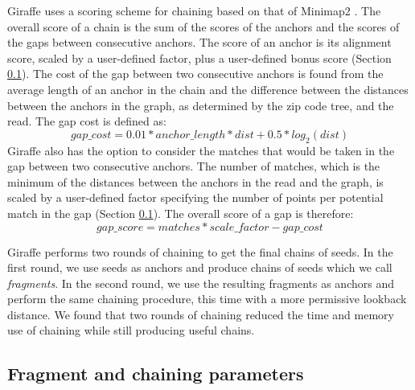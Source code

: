 \documentclass[11pt]{ucscthesis}
\begin{document}
Giraffe uses a scoring scheme for chaining based on that of Minimap2 \cite{minimap2_2021}.
The overall score of a chain is the sum of the scores of the anchors and the scores of the gaps between consecutive anchors.
The score of an anchor is its alignment score, scaled by a user-defined factor, plus a user-defined bonus score (Section \ref{sec:chaining_params}).
The cost of the gap between two consecutive anchors is found from the average length of an anchor in the chain and the difference between the distances between the anchors in the graph, as determined by the zip code tree, and the read.
The gap cost is defined as:
\begin{equation}
gap\_cost = 0.01*anchor\_length*dist + 0.5*log_2(dist)
\end{equation}
Giraffe also has the option to consider the matches that would be taken in the gap between two consecutive anchors.
The number of matches, which is the minimum of the distances between the anchors in the read and the graph, is scaled by a user-defined factor specifying the number of points per potential match in the gap (Section \ref{sec:chaining_params}).
The overall score of a gap is therefore:
\begin{equation}
    gap\_score = matches * scale\_factor - gap\_cost
\end{equation}


Giraffe performs two rounds of chaining to get the final chains of seeds.
In the first round, we use seeds as anchors and produce chains of seeds which we call \emph{fragments}.
In the second round, we use the resulting fragments as anchors and perform the same chaining procedure, this time with a more permissive lookback distance.
We found that two rounds of chaining reduced the time and memory use of chaining while still producing useful chains.



\subsection{Fragment and chaining parameters}
\label{sec:chaining_params}
\end{document}
